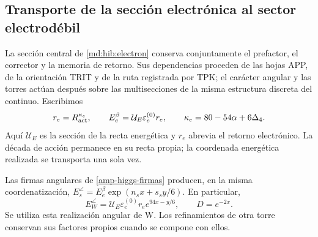 \subsection{Transporte de la sección electrónica al sector electrodébil}
\label{amp-ew-seccion}

La sección central de \eqref{md:hib:electron} conserva conjuntamente el
prefactor, el corrector y la memoria de retorno. Sus dependencias proceden
de las hojas APP, de la orientación TRIT y de la ruta registrada por TPK;
el carácter angular y las torres actúan después sobre las multisecciones
de la misma estructura discreta del continuo. Escribimos
\begin{equation}
 r_e=R_{\rm act}^{\kappa_e},\qquad
 E_e^\beta=\mathcal U_E\varepsilon_e^{(0)}r_e,\qquad
 \kappa_e=80-54\alpha+6\Delta_4.
 \label{amp-ew-electron}
\end{equation}
Aquí $\mathcal U_E$ es la sección de la recta energética y $r_e$ abrevia
el retorno electrónico. La década de acción permanece en su recta propia;
la coordenada energética realizada se transporta una sola vez.

Las firmas angulares de \eqref{amp-higgs-firmas} producen, en la misma
coordenatización, $E_s^\angle=E_e^\beta\exp(n_sx+s_sy/6)$. En particular,
\begin{equation}
 E_W^\angle=\mathcal U_E\varepsilon_e^{(0)}r_e
                  e^{94x-y/6},\qquad D=e^{-2x}.
 \label{amp-ew-w}
\end{equation}
Se utiliza esta realización angular de W. Los refinamientos de otra torre
conservan sus factores propios cuando se compone con ellos.

